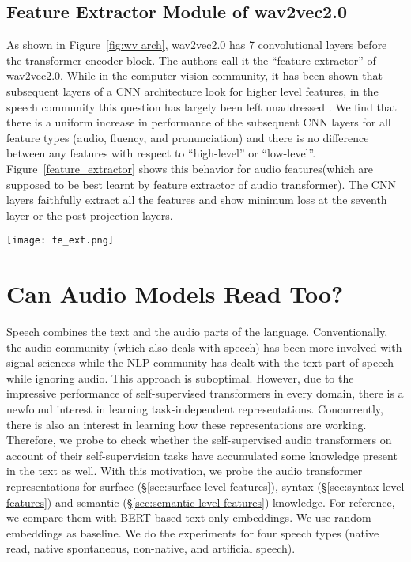 \documentclass[sigconf]{acmart}
\newcommand{\wv}{wav2vec2.0\xspace}
\begin{document}
\subsection{Feature Extractor Module of {\wv}}
As shown in Figure~\ref{fig:wv arch}, {\wv} has 7 convolutional layers before the transformer encoder block. The authors call it the ``feature extractor'' of \wv. While in the computer vision community, it has been shown that subsequent layers of a CNN architecture look for higher level features, in the speech community this question has largely been left unaddressed \cite{erhan2010understanding,gong2018deep}. We find that there is a uniform increase in performance of the subsequent CNN layers for all feature types (audio, fluency, and pronunciation) and there is no difference between any features with respect to ``high-level'' or ``low-level''. Figure~\ref{feature_extractor} shows this behavior for audio features(which are supposed to be best learnt by feature extractor of audio transformer). The CNN layers faithfully extract all the features and show minimum loss at the seventh layer or the post-projection layers.
\begin{figure*}
  \texttt{[image: fe\_ext.png]}
  \caption{\label{feature_extractor}Performance of audio features on the various layers of Feature Extractor}
\end{figure*}



\section{Can Audio Models Read Too?}
\label{sec:Can Audio Models Read Too?}
Speech combines the text and the audio parts of the language. Conventionally, the audio community (which also deals with speech) has been more involved with signal sciences while the NLP community has dealt with the text part of speech while ignoring audio. This approach is suboptimal. However, due to the impressive performance of self-supervised transformers in every domain, there is a newfound interest in learning task-independent representations. Concurrently, there is also an interest in learning how these representations are working. Therefore, we probe to check whether the self-supervised audio transformers on account of their self-supervision tasks have accumulated some knowledge present in the text as well. With this motivation, we probe the audio transformer representations for surface (\S\ref{sec:surface level features}), syntax (\S\ref{sec:syntax level features}) and semantic (\S\ref{sec:semantic level features}) knowledge. For reference, we compare them with BERT based text-only embeddings. We use random embeddings as baseline. We do the experiments for four speech types (native read, native spontaneous, non-native, and artificial speech).
\end{document}
